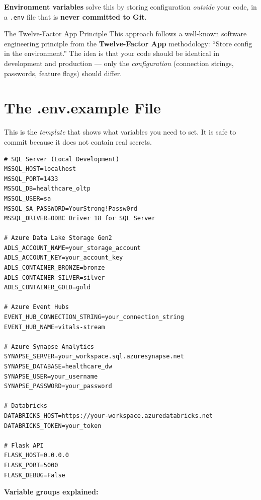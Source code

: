 \documentclass[12pt, a4paper, oneside]{report}
\begin{document}
\textbf{Environment variables} solve this by storing configuration \textit{outside} your code, in a \texttt{.env} file that is \textbf{never committed to Git}.

\begin{conceptbox}{The Twelve-Factor App Principle}
This approach follows a well-known software engineering principle from the \textbf{Twelve-Factor App} methodology: ``Store config in the environment.'' The idea is that your code should be identical in development and production --- only the \textit{configuration} (connection strings, passwords, feature flags) should differ.
\end{conceptbox}

\section{The .env.example File}

This is the \textit{template} that shows what variables you need to set. It is safe to commit because it does not contain real secrets.

\begin{lstlisting}[style=bashstyle, caption={.env.example --- the template (safe to share)}]
# SQL Server (Local Development)
MSSQL_HOST=localhost
MSSQL_PORT=1433
MSSQL_DB=healthcare_oltp
MSSQL_USER=sa
MSSQL_SA_PASSWORD=YourStrong!Passw0rd
MSSQL_DRIVER=ODBC Driver 18 for SQL Server

# Azure Data Lake Storage Gen2
ADLS_ACCOUNT_NAME=your_storage_account
ADLS_ACCOUNT_KEY=your_account_key
ADLS_CONTAINER_BRONZE=bronze
ADLS_CONTAINER_SILVER=silver
ADLS_CONTAINER_GOLD=gold

# Azure Event Hubs
EVENT_HUB_CONNECTION_STRING=your_connection_string
EVENT_HUB_NAME=vitals-stream

# Azure Synapse Analytics
SYNAPSE_SERVER=your_workspace.sql.azuresynapse.net
SYNAPSE_DATABASE=healthcare_dw
SYNAPSE_USER=your_username
SYNAPSE_PASSWORD=your_password

# Databricks
DATABRICKS_HOST=https://your-workspace.azuredatabricks.net
DATABRICKS_TOKEN=your_token

# Flask API
FLASK_HOST=0.0.0.0
FLASK_PORT=5000
FLASK_DEBUG=False
\end{lstlisting}

\textbf{Variable groups explained:}
\end{document}
